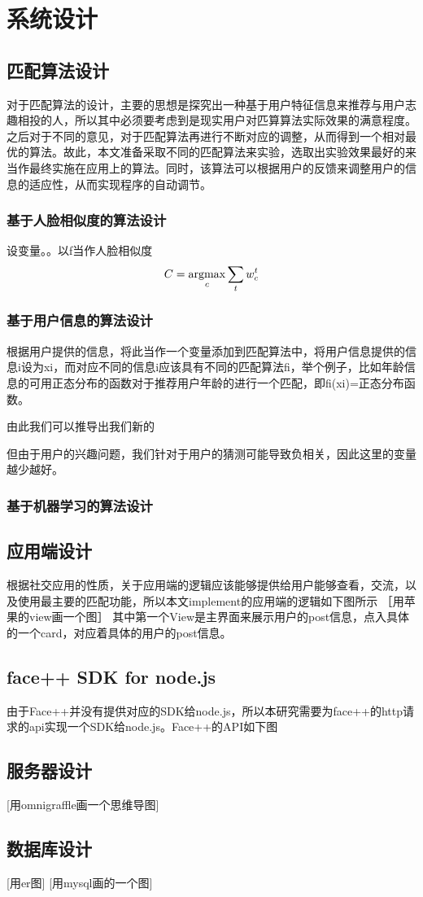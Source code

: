 
\chapter{系统设计}

\section{匹配算法设计}
对于匹配算法的设计，主要的思想是探究出一种基于用户特征信息来推荐与用户志趣相投的人，所以其中必须要考虑到是现实用户对匹算算法实际效果的满意程度。之后对于不同的意见，对于匹配算法再进行不断对应的调整，从而得到一个相对最优的算法。故此，本文准备采取不同的匹配算法来实验，选取出实验效果最好的来当作最终实施在应用上的算法。同时，该算法可以根据用户的反馈来调整用户的信息的适应性，从而实现程序的自动调节。
\subsection{基于人脸相似度的算法设计}
设变量。。以f当作人脸相似度
 \begin{equation}
   C = \mathop{\argmax}_{c}{\sum_t{w^t_c}}%
 \end{equation}

\subsection{基于用户信息的算法设计}
根据用户提供的信息，将此当作一个变量添加到匹配算法中，将用户信息提供的信息i设为xi，而对应不同的信息i应该具有不同的匹配算法fi，举个例子，比如年龄信息的可用正态分布的函数对于推荐用户年龄的进行一个匹配，即fi(xi)=正态分布函数。

由此我们可以推导出我们新的

但由于用户的兴趣问题，我们针对于用户的猜测可能导致负相关，因此这里的变量越少越好。
\subsection{基于机器学习的算法设计}

\section{应用端设计}

根据社交应用的性质，关于应用端的逻辑应该能够提供给用户能够查看，交流，以及使用最主要的匹配功能，所以本文implement的应用端的逻辑如下图所示
［用苹果的view画一个图］
其中第一个View是主界面来展示用户的post信息，点入具体的一个card，对应着具体的用户的post信息。

\section{face++ SDK for node.js}
由于Face++并没有提供对应的SDK给node.js，所以本研究需要为face++的http请求的api实现一个SDK给node.js。Face++的API如下图


\section{服务器设计}
[用omnigraffle画一个思维导图]


\section{数据库设计}

[用er图]
[用mysql画的一个图]



